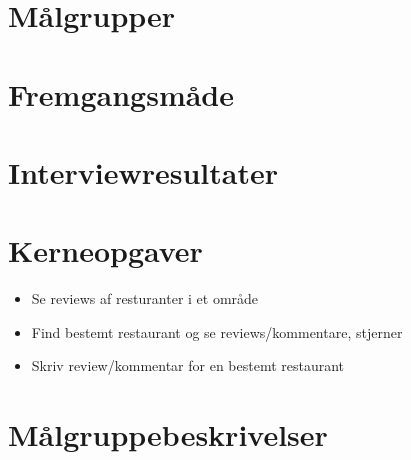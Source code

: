 \documentclass[a4paper, 12pt]{article}
\begin{document}

\newpage
\setcounter{page}{1}
\fancyfoot[C]{\thepage}

\section{Målgrupper}
\label{sub:Maalgrupper}

\section{Fremgangsmåde}
\label{sec:Fremgangsmaade}

\section{Interviewresultater}
\label{sec:Interviewresultater}

\section{Kerneopgaver}
\label{sec:Kerneopgaver}
\begin{itemize}
\item Se reviews af resturanter i et område
\item Find bestemt restaurant og se reviews/kommentare, stjerner
\item Skriv review/kommentar for en bestemt restaurant
\end{itemize}

\section{Målgruppebeskrivelser}
\label{sec:Maalgruppebeskrivelser}
\end{document}
